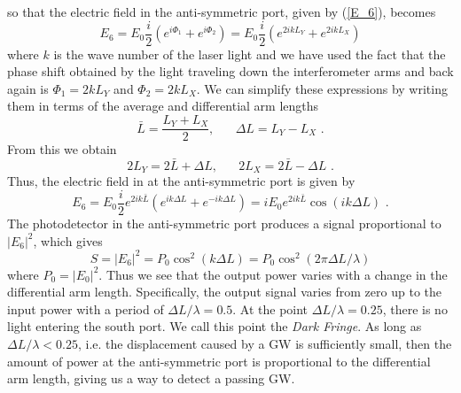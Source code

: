 \documentclass[11pt]{cuthesis}
\newcommand{\fs}{\text{ .}}
\begin{document}
so that the electric field in the anti-symmetric port, given by (\ref{E_6}), becomes
\begin{equation}
E_6=E_0 \frac{i}{2} \left( e^{i\Phi_1} + e^{i\Phi_2}  \right)=E_0 \frac{i}{2} \left( e^{2 i k L_Y} + e^{2 i k L_X}  \right)
\end{equation}
where $k$ is the wave number of the laser light and we have used the fact that the phase shift obtained by the light traveling down the interferometer arms and back again is $\Phi_1=2 k L_Y$ and $\Phi_2=2 k L_X$. We can simplify these expressions by writing them in terms of the average and differential arm lengths 
\begin{equation}
\bar{L}=\frac{L_Y+L_X}{2}, \hspace{20pt} \Delta L =L_Y-L_X \fs
\end{equation}
From this we obtain
\begin{equation}
2L_Y=2\bar{L}+\Delta L, \hspace{20pt} 2L_X=2\bar{L}-\Delta L \fs 
\end{equation}
Thus, the electric field in at the anti-symmetric port is given by
\begin{equation}
E_6=E_0\frac{i}{2}e^{2ik\bar{L}}\left( e^{ik\Delta L} + e^{-ik\Delta L} \right)=iE_0e^{2ik\bar{L}}\cos(ik\Delta L) \fs
\end{equation}
The photodetector in the anti-symmetric port produces a signal proportional to $|E_6|^2$, which gives 
\begin{equation}
S=|E_6|^2=P_0 \cos^2(k \Delta L)=P_0 \cos^2(2\pi \Delta L / \lambda) 
\end{equation}
where $P_0=|E_0|^2$. Thus we see that the output power varies with a change in the differential arm length. Specifically, the output signal varies from zero up to the input power with a period of $\Delta L/\lambda=0.5$. At the point $\Delta L/\lambda=0.25$, there is no light entering the south port. We call this point the \emph{Dark Fringe}. As long as $\Delta L/\lambda<0.25$, i.e. the displacement caused by a GW is sufficiently small, then the amount of power at the anti-symmetric port is proportional to the differential arm length, giving us a way to detect a passing GW.

\end{document}
